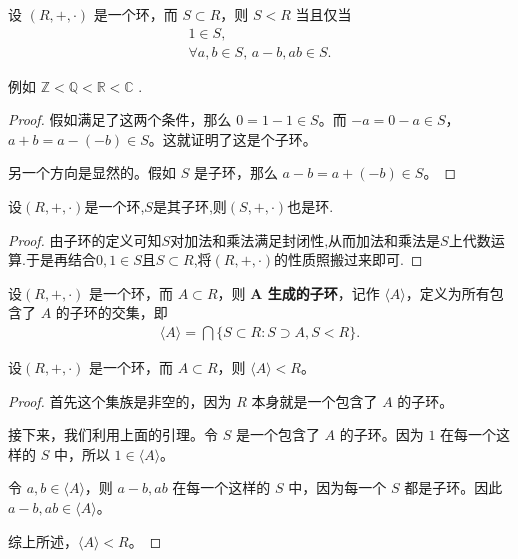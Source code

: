 \documentclass[../../main.tex]{subfiles}
\begin{document}
\begin{lemma}[子环的充要条件]\label{lemma:子环的充要条件}
设 $(R, +, \cdot)$ 是一个环，而 $S \subset R$，则 $S < R$ 当且仅当
\begin{gather*}
1 \in S ,\\
\forall a, b \in S, \, a - b, ab \in S .
\end{gather*}
\end{lemma}
\begin{note}
例如 $\mathbb{Z}< \mathbb{Q}< \mathbb{R}< \mathbb{C}$ . 
\end{note}
\begin{proof}
假如满足了这两个条件，那么 $0 = 1 - 1 \in S$。而 $-a = 0 - a \in S$，$a + b = a - (-b) \in S$。这就证明了这是个子环。

另一个方向是显然的。假如 $S$ 是子环，那么 $a - b = a + (-b) \in S$。

\end{proof}

\begin{proposition}[子环仍是环]\label{proposition:子环仍是环}
设$(R,+,\cdot)$是一个环,$S$是其子环,则$(S,+,\cdot)$也是环.
\end{proposition}
\begin{proof}
由子环的定义可知$S$对加法和乘法满足封闭性,从而加法和乘法是$S$上代数运算.于是再结合$0,1\in S$且$S\subset R$,将$(R,+,\cdot)$的性质照搬过来即可.

\end{proof}

\begin{definition}[由子集生成的子环]
设$(R, +, \cdot)$ 是一个环，而 $A \subset R$，则 \textbf{$\boldsymbol{A}$ 生成的子环}，记作 $\langle A\rangle$，定义为所有包含了 $A$ 的子环的交集，即
\begin{align*}
\langle A\rangle = \bigcap \{S \subset R : S \supset A, S < R\} .
\end{align*}
\end{definition}

\begin{proposition}[由子集生成的子环仍是子环]\label{proposition:生成的子环仍是子环}
设$(R, +, \cdot)$ 是一个环，而 $A \subset R$，则 $\langle A\rangle < R$。
\end{proposition}
\begin{proof}
首先这个集族是非空的，因为 $R$ 本身就是一个包含了 $A$ 的子环。

接下来，我们利用上面的引理。令 $S$ 是一个包含了 $A$ 的子环。因为 $1$ 在每一个这样的 $S$ 中，所以 $1 \in \langle A\rangle$。

令 $a, b \in \langle A\rangle$，则 $a - b, ab$ 在每一个这样的 $S$ 中，因为每一个 $S$ 都是子环。因此 $a - b, ab \in \langle A\rangle$。

综上所述，$\langle A\rangle < R$。

\end{proof}
\end{document}
